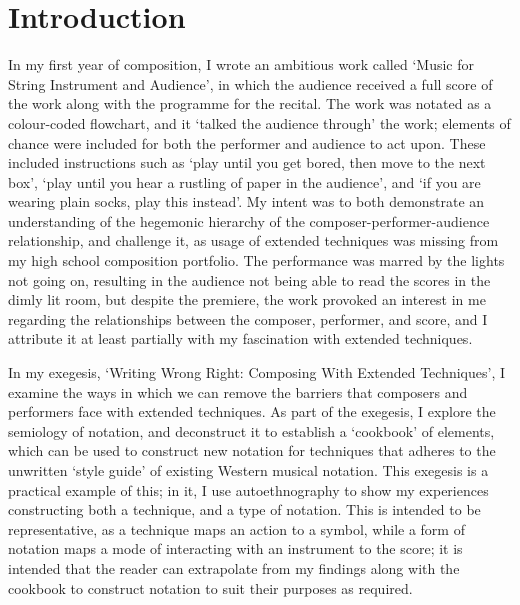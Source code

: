 \section{Introduction}


\doublespace{}

In my first year of composition, I wrote an ambitious work called `Music for String Instrument and Audience', in which the audience received a full score of the work along with the programme for the recital.
The work was notated as a colour-coded flowchart, and it `talked the audience through' the work; elements of chance were included for both the performer and audience to act upon.
These included instructions such as `play until you get bored, then move to the next box', `play until you hear a rustling of paper in the audience', and `if you are wearing plain socks, play this instead'.
My intent was to both demonstrate an understanding of the hegemonic hierarchy of the composer-performer-audience relationship, and challenge it, as usage of extended techniques was missing from my high school composition portfolio.
The performance was marred by the lights not going on, resulting in the audience not being able to read the scores in the dimly lit room, but despite the premiere, the work provoked an interest in me regarding the relationships between the composer, performer, and score, and I attribute it at least partially with my fascination with extended techniques.

In my exegesis, `Writing Wrong Right: Composing With Extended Techniques', I examine the ways in which we can remove the barriers that composers and performers face with extended techniques.
As part of the exegesis, I explore the semiology of notation, and deconstruct it to establish a `cookbook' of elements, which can be used to construct new notation for techniques that adheres to the unwritten `style guide' of existing Western musical notation.
This exegesis is a practical example of this; in it, I use autoethnography to show my experiences constructing both a technique, and a type of notation. 
This is intended to be representative, as a technique maps an action to a symbol, while a form of notation maps a mode of interacting with an instrument to the score;
it is intended that the reader can extrapolate from my findings along with the cookbook to construct notation to suit their purposes as required.